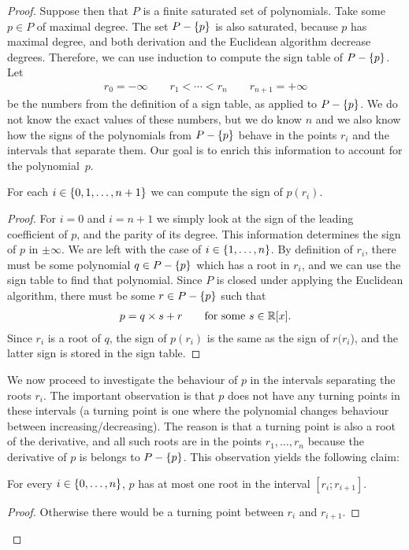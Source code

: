 \begin{proof}
Suppose then that $P$ is a finite saturated set of polynomials.    Take some $p \in P$ of maximal degree.  The set $P - \{p\}$ is also saturated, because $p$ has maximal degree, and both derivation and the Euclidean algorithm decrease degrees. Therefore, we can use induction to compute the  sign table of $P - \{p\}$. Let 
\begin{align*}
  r_0 = -\infty \qquad r_1 < \cdots < r_n  \qquad r_{n+1} = +\infty
\end{align*}
be the numbers from  the definition of a sign table, as applied to  $P - \{p\}$. We do not know the exact values of these numbers, but we do know $n$ and we also know how the signs of the polynomials from $P - \{p\}$  behave in the points $r_i$ and the intervals that separate them. Our goal is to enrich this information to account for the polynomial~$p$. 

\begin{claim}
	For each $i \in \{0,1,\ldots,n+1\}$  we can compute the sign of $p(r_i)$.
\end{claim}
\begin{proof} For  $i=0$ and $i=n+1$ we simply look at the sign of the leading coefficient of $p$, and the parity of its degree. This information determines the sign of  $p$ in $\pm \infty$. We are left with the case of $i \in \{1,\ldots,n\}$. 
By definition of $r_i$, there must be some polynomial $q \in P - \{p\}$ which has a root in $r_i$, and we can use the sign table to find that polynomial. Since $P$ is closed under applying the Euclidean algorithm, there must be some $r \in P - \{p\}$ such that 
\begin{align*}
  p = q \times s + r \qquad \text{for some $s \in \mathbb R[x]$}.
\end{align*}
Since $r_i$ is a root of $q$, the sign of $p(r_i)$ is the same as the sign of $r(r_i$), and the latter sign is stored in the sign table. 	
\end{proof}

We now proceed to investigate the behaviour  of $p$ in the intervals separating the roots $r_i$. The important observation is that $p$ does not have any turning points in these intervals (a turning point is one where the polynomial changes behaviour between increasing/decreasing). The reason is that a turning point is also a root of the derivative, and all such roots are in the points $r_1,\ldots,r_n$ because the derivative of $p$ is belongs to  $P - \{p\}$. This observation yields the following claim:


\begin{claim}\label{claim:derivative-nonzero}
	For every $i \in \{0,\ldots,n\}$, $p$ has at most one root in the interval $[r_i;r_{i+1}]$. 
\end{claim}
\begin{proof}
Otherwise there would be a turning point between $r_i$ and $r_{i+1}$. 	
\end{proof}


\end{proof}
